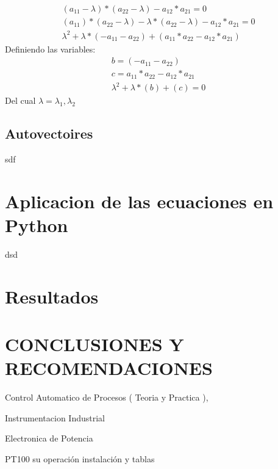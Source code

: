 \documentclass[Spanish,12pt,doublespace,german,letterpaper,dvipdfm]{article}
\begin{document}
\begin{eqnarray}
  (a_{11}-\lambda)*(a_{22}-\lambda) - a_{12}*a_{21}=0   \\
  (a_{11})*(a_{22}-\lambda)-\lambda*(a_{22}-\lambda) - a_{12}*a_{21}=0  \\
  \lambda^2 +\lambda *(-a_{11}-a_{22})+(a_{11}*a_{22}-a_{12}*a_{21})
\end{eqnarray}
Definiendo las variables:
\begin{eqnarray}
b = (-a_{11}-a_{22})   \\
c = a_{11}*a_{22}-a_{12}*a_{21}  \\
\lambda^2 +\lambda *(b)+(c) = 0 
\end{eqnarray}
Del cual 
$\lambda =\lambda_1 ,\lambda_2 $
\subsection{Autovectoires}
sdf
\section{Aplicacion de las ecuaciones en Python}

dsd
\section{Resultados}
\section{CONCLUSIONES Y RECOMENDACIONES}



\begin{thebibliography}{1}
Control Automatico de Procesos ( Teoria y Practica ),

Instrumentacion Industrial

Electronica de Potencia

PT100 su operaci\'on instalaci\'on y tablas


\end{thebibliography}
\end{document}
